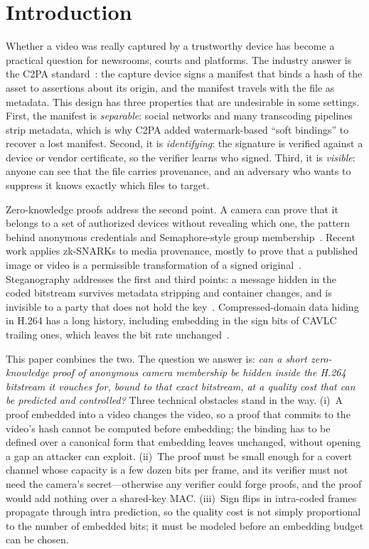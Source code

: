 \section{Introduction}
\label{sec:intro}

Whether a video was really captured by a trustworthy device has become a practical question for newsrooms, courts and platforms. The industry answer is the C2PA standard~\cite{c2pa_spec}: the capture device signs a manifest that binds a hash of the asset to assertions about its origin, and the manifest travels with the file as metadata. This design has three properties that are undesirable in some settings. First, the manifest is \emph{separable}: social networks and many transcoding pipelines strip metadata, which is why C2PA added watermark-based ``soft bindings'' to recover a lost manifest. Second, it is \emph{identifying}: the signature is verified against a device or vendor certificate, so the verifier learns who signed. Third, it is \emph{visible}: anyone can see that the file carries provenance, and an adversary who wants to suppress it knows exactly which files to target.

Zero-knowledge proofs address the second point. A camera can prove that it belongs to a set of authorized devices without revealing which one, the pattern behind anonymous credentials and Semaphore-style group membership~\cite{zerocash2014,semaphore}. Recent work applies zk-SNARKs to media provenance, mostly to prove that a published image or video is a permissible transformation of a signed original~\cite{photoproof2016,zkimg2022,veritas2024,vimz2024,zkcinema2026,aipa2026}. Steganography addresses the first and third points: a message hidden in the coded bitstream survives metadata stripping and container changes, and is invisible to a party that does not hold the key~\cite{simmons1984,cachin1998,fridrich2009book}. Compressed-domain data hiding in H.264 has a long history, including embedding in the sign bits of CAVLC trailing ones, which leaves the bit rate unchanged~\cite{kapotas2007,mobasseri2007,fragile_h264_mtap}.

This paper combines the two. The question we answer is: \emph{can a short zero-knowledge proof of anonymous camera membership be hidden inside the H.264 bitstream it vouches for, bound to that exact bitstream, at a quality cost that can be predicted and controlled?} Three technical obstacles stand in the way. (i)~A proof embedded into a video changes the video, so a proof that commits to the video's hash cannot be computed before embedding; the binding has to be defined over a canonical form that embedding leaves unchanged, without opening a gap an attacker can exploit. (ii)~The proof must be small enough for a covert channel whose capacity is a few dozen bits per frame, and its verifier must not need the camera's secret---otherwise any verifier could forge proofs, and the proof would add nothing over a shared-key MAC. (iii)~Sign flips in intra-coded frames propagate through intra prediction, so the quality cost is not simply proportional to the number of embedded bits; it must be modeled before an embedding budget can be chosen.

